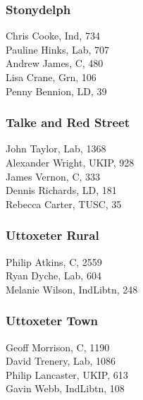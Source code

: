 \documentclass[a4paper,openany,10pt]{book}
\begin{document}
\subsubsection*{Stonydelph}



Chris Cooke, Ind, 734\\
Pauline Hinks, Lab, 707\\
Andrew James, C, 480\\
Lisa Crane, Grn, 106\\
Penny Bennion, LD, 39\\


\subsubsection*{Talke and Red Street}



John Taylor, Lab, 1368\\
Alexander Wright, UKIP, 928\\
James Vernon, C, 333\\
Dennis Richards, LD, 181\\
Rebecca Carter, TUSC, 35\\


\subsubsection*{Uttoxeter Rural}



Philip Atkins, C, 2559\\
Ryan Dyche, Lab, 604\\
Melanie Wilson, IndLibtn, 248\\


\subsubsection*{Uttoxeter Town}



Geoff Morrison, C, 1190\\
David Trenery, Lab, 1086\\
Philip Lancaster, UKIP, 613\\
Gavin Webb, IndLibtn, 108\\
\end{document}
